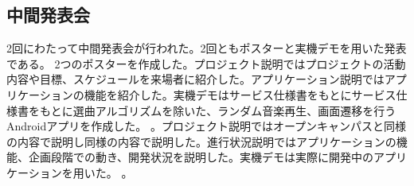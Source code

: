\subsection{中間発表会}
2回にわたって中間発表会が行われた。2回ともポスターと実機デモを用いた発表である。
2つのポスターを作成した。プロジェクト説明ではプロジェクトの活動内容や目標、スケジュールを来場者に紹介した。アプリケーション説明ではアプリケーションの機能を紹介した。実機デモはサービス仕様書をもとにサービス仕様書をもとに選曲アルゴリズムを除いた、ランダム音楽再生、画面遷移を行うAndroidアプリを作成した。
。プロジェクト説明ではオープンキャンパスと同様の内容で説明し同様の内容で説明した。進行状況説明ではアプリケーションの機能、企画段階での動き、開発状況を説明した。実機デモは実際に開発中のアプリケーションを用いた。
。
